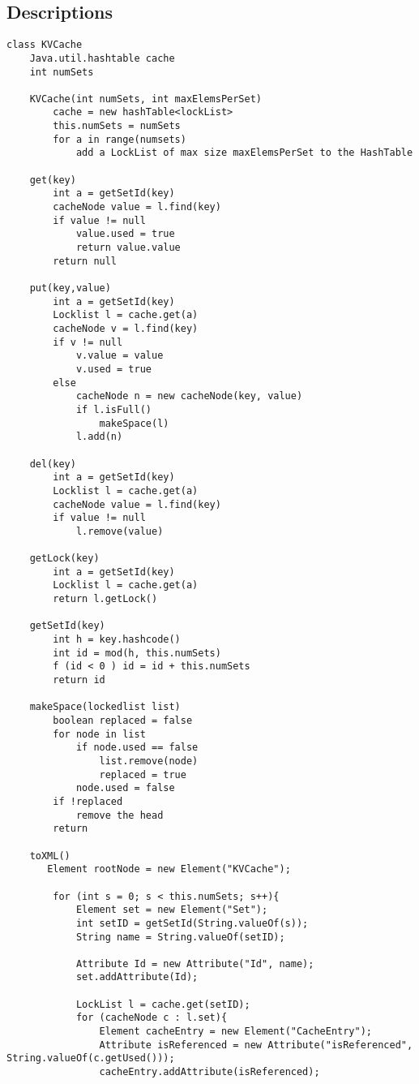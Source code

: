 \subsection{Descriptions}
\begin{verbatim}
class KVCache
    Java.util.hashtable cache
    int numSets
    
    KVCache(int numSets, int maxElemsPerSet)
        cache = new hashTable<lockList>
        this.numSets = numSets
        for a in range(numsets)
            add a LockList of max size maxElemsPerSet to the HashTable
    
    get(key)
        int a = getSetId(key)
        cacheNode value = l.find(key)
        if value != null
            value.used = true
            return value.value
        return null
    
    put(key,value)
        int a = getSetId(key)
        Locklist l = cache.get(a)
        cacheNode v = l.find(key)
        if v != null
            v.value = value
            v.used = true
        else
            cacheNode n = new cacheNode(key, value)
            if l.isFull()
                makeSpace(l)
            l.add(n)
    
    del(key)
        int a = getSetId(key)
        Locklist l = cache.get(a)
        cacheNode value = l.find(key)
        if value != null
            l.remove(value)
    
    getLock(key)
        int a = getSetId(key)
        Locklist l = cache.get(a)
        return l.getLock()
    
    getSetId(key)
        int h = key.hashcode()
        int id = mod(h, this.numSets)
        f (id < 0 ) id = id + this.numSets
        return id
    
    makeSpace(lockedlist list)
        boolean replaced = false
        for node in list
            if node.used == false
                list.remove(node)
                replaced = true
            node.used = false
        if !replaced
            remove the head
        return 
    
    toXML()
       Element rootNode = new Element("KVCache");
    		
    	for (int s = 0; s < this.numSets; s++){
    		Element set = new Element("Set");
    		int setID = getSetId(String.valueOf(s));
    		String name = String.valueOf(setID);
    		
    		Attribute Id = new Attribute("Id", name);
    		set.addAttribute(Id);
    		
    		LockList l = cache.get(setID);
    		for (cacheNode c : l.set){
    			Element cacheEntry = new Element("CacheEntry");
    			Attribute isReferenced = new Attribute("isReferenced", String.valueOf(c.getUsed()));
    			cacheEntry.addAttribute(isReferenced);
    			

\end{verbatim}

